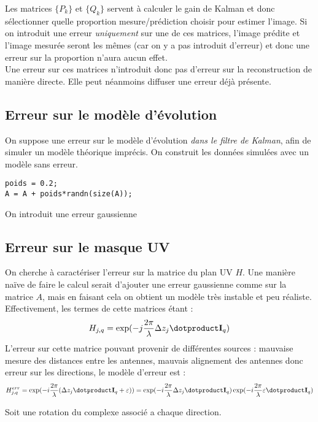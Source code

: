 \documentclass[titlepage]{article}
\begin{document}
	Les matrices $\{P_k\}$ et $\{Q_k\}$ servent à calculer le gain de Kalman et donc sélectionner quelle proportion mesure/prédiction choisir pour estimer l'image. Si on introduit une erreur \emph{uniquement} sur une de ces matrices, l'image prédite et l'image mesurée seront les mêmes (car on y a pas introduit d'erreur) et donc une erreur sur la proportion n'aura aucun effet.\\
	Une erreur sur ces matrices n'introduit donc pas d'erreur sur la reconstruction de manière directe. Elle peut néanmoins diffuser une erreur déjà présente.
	
	\subsection{Erreur sur le modèle d'évolution}
	
	On suppose une erreur sur le modèle d'évolution \emph{dans le filtre de Kalman}, afin de simuler un modèle théorique imprécis. On construit les données simulées avec un modèle sans erreur.\\
	\begin{verbatim}
poids = 0.2;
A = A + poids*randn(size(A));
	\end{verbatim}
	
	On introduit une erreur gaussienne
	
	\subsection{Erreur sur le masque UV}
	
	On cherche à caractériser l'erreur sur la matrice du plan UV $H$. Une manière naïve de faire le calcul serait d'ajouter une erreur gaussienne comme sur la matrice $A$, mais en faisant cela on obtient un modèle très instable et peu réaliste. Effectivement, les termes de cette matrices étant :
	$$
		H_{j,q} = \exp(-j\frac{2\pi}{\lambda}\Delta z_j\dotproduct\mathbf{I}_q)
	$$
	L'erreur sur cette matrice pouvant provenir de différentes sources : mauvaise mesure des distances entre les antennes, mauvais alignement des antennes donc erreur sur les directions, le modèle d'erreur est :
	$$
		H_{j,q}^{err} =  \exp(-i\frac{2\pi}{\lambda}(\Delta z_j\dotproduct\mathbf{I}_q + \varepsilon)) =  \exp(-i\frac{2\pi}{\lambda}\Delta z_j\dotproduct\mathbf{I}_q)\exp(-i\frac{2\pi}{\lambda}\varepsilon\dotproduct\mathbf{I}_q)
	$$
	
	Soit une rotation du complexe associé a chaque direction. \\
	
\end{document}
